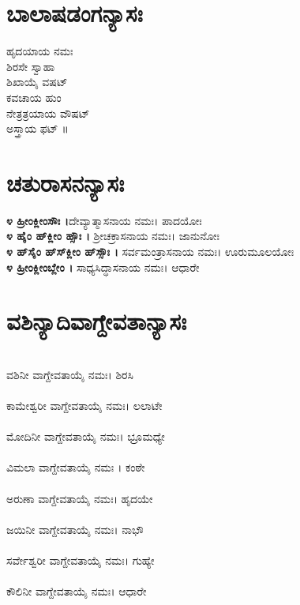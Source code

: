 \section{ಬಾಲಾಷಡಂಗನ್ಯಾಸಃ}
 ಹೃದಯಾಯ ನಮಃ\\
 ಶಿರಸೇ ಸ್ವಾಹಾ\\
ಶಿಖಾಯೈ ವಷಟ್\\
 ಕವಚಾಯ ಹುಂ\\
ನೇತ್ರತ್ರಯಾಯ ವೌಷಟ್\\
 ಅಸ್ತ್ರಾಯ ಫಟ್ ॥
\section{ಚತುರಾಸನನ್ಯಾಸಃ}
{\bfseries ೪ ಹ್ರೀಂಕ್ಲೀಂಸೌಃ ।}ದೇವ್ಯಾತ್ಮಾಸನಾಯ ನಮಃ। ಪಾದಯೋಃ\\
{\bfseries ೪ ಹೈಂ ಹ್‌ಕ್ಲೀಂ ಹ್ಸೌಃ ।} ಶ್ರೀಚಕ್ರಾಸನಾಯ ನಮಃ। ಜಾನುನೋಃ\\
{\bfseries ೪ ಹ್‌ಸೈಂ ಹ್‌ಸ್‌ಕ್ಲೀಂ ಹ್‌ಸ್ಸೌಃ ।} ಸರ್ವಮಂತ್ರಾಸನಾಯ ನಮಃ। ಊರುಮೂಲಯೋಃ\\
{\bfseries ೪ ಹ್ರೀಂಕ್ಲೀಂಬ್ಲೇಂ ।} ಸಾಧ್ಯಸಿದ್ಧಾಸನಾಯ ನಮಃ। ಆಧಾರೇ
\section{ವಶಿನ್ಯಾದಿವಾಗ್ದೇವತಾನ್ಯಾಸಃ}
\\ ವಶಿನೀ ವಾಗ್ದೇವತಾಯೈ ನಮಃ। ಶಿರಸಿ\\
\\ ಕಾಮೇಶ್ವರೀ ವಾಗ್ದೇವತಾಯೈ ನಮಃ। ಲಲಾಟೇ\\
\\ ಮೋದಿನೀ ವಾಗ್ದೇವತಾಯೈ ನಮಃ। ಭ್ರೂಮಧ್ಯೇ\\
\\ ವಿಮಲಾ ವಾಗ್ದೇವತಾಯೈ ನಮಃ । ಕಂಠೇ\\
\\ ಅರುಣಾ ವಾಗ್ದೇವತಾಯೈ ನಮಃ। ಹೃದಯೇ\\
\\ ಜಯಿನೀ ವಾಗ್ದೇವತಾಯೈ ನಮಃ। ನಾಭೌ\\
\\ ಸರ್ವೇಶ್ವರೀ ವಾಗ್ದೇವತಾಯೈ ನಮಃ। ಗುಹ್ಯೇ\\
\\ ಕೌಲಿನೀ ವಾಗ್ದೇವತಾಯೈ ನಮಃ। ಆಧಾರೇ
